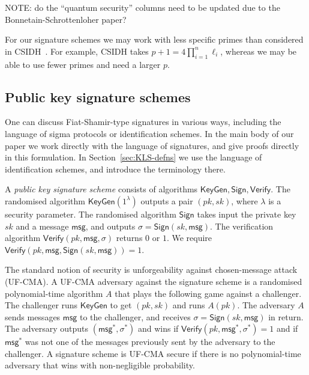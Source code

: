 \documentclass{llncs}
\newcommand{\msg}{\textsf{msg}}
\newcommand{\KeyGen}{\textsf{KeyGen}}
\newcommand{\Sign}{\textsf{Sign}}
\newcommand{\Verify}{\textsf{Verify}}
\begin{document}
NOTE: do the ``quantum security'' columns need to be updated due to the Bonnetain-Schrottenloher paper?



For our signature schemes we may work with less specific primes than considered in CSIDH~\cite{CLMPR18}. For example, CSIDH takes $p+1 = 4\prod_{i=1}^n\ell_i$, whereas we may be able to use fewer primes and need a larger $p$.




\subsection{Public key signature schemes}

One can discuss Fiat-Shamir-type signatures in various ways, including the language of sigma protocols or identification schemes.
In the main body of our paper we work directly with the language of signatures, and give proofs directly in this formulation.
In Section~\ref{sec:KLS-defns} we use the language of identification schemes, and introduce the terminology there.


A \emph{public key signature scheme} consists of algorithms $\KeyGen, \Sign, \Verify$.
The randomised algorithm $\KeyGen( 1^\lambda )$ outputs a pair $(pk,sk)$, where $\lambda$ is a security parameter.
The randomised algorithm $\Sign$ takes input the private key $sk$ and a message $\msg$, and  outputs $\sigma = \Sign( sk, \msg )$.
The verification algorithm $\Verify( pk, \msg, \sigma )$ returns $0$ or $1$.
We require $\Verify( pk, \msg, \Sign( sk, \msg )) = 1$.


The standard notion of security is unforgeability against chosen-message attack (UF-CMA).
A UF-CMA adversary against the signature scheme is a randomised polynomial-time algorithm $A$ that plays the following game against a challenger.
The challenger runs $\KeyGen$ to get $(pk,sk)$ and runs $A( pk )$.
The adversary $A$ sends messages $\msg$ to the challenger, and receives $\sigma = \Sign(sk, \msg)$ in return.
The adversary outputs $(\msg^*, \sigma^*)$ and wins if $\Verify( pk, \msg^*, \sigma^* ) = 1$ and if $\msg^*$ was not one of the messages previously sent by the adversary to the challenger.
A signature scheme is UF-CMA secure if there is no polynomial-time adversary that wins with non-negligible probability.



\end{document}
